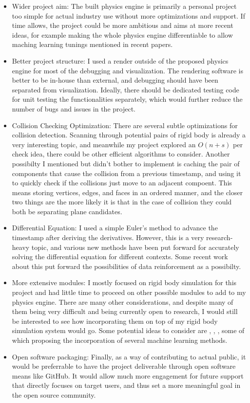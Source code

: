 \documentclass[12pt,a4paper,twoside,openright]{report}
\begin{document}
\begin{itemize}
\item Wider project aim: The built physics engine is primarily a personal project too simple for actual industry use without more optimizations and support. If time allows, the project could be more ambitious and aims at more recent ideas, for example making the whole physics engine differentiable to allow maching learning tunings mentioned in recent papers\cite{degrave2019differentiable}. 
\item Better project structure: I used a render outside of the proposed physics engine for most of the debugging and visualization. The rendering software is better to be in-house than external, and debugging should have been separated from visualization. Ideally, there should be dedicated testing code for unit testing the functionalities separately, which would further reduce the number of bugs and issues in the project.
\item Collision Checking Optimization: There are several subtle optimizations for collision detection. Scanning through potential pairs of rigid body is already a very interesting topic, and meanwhile my project explored an $O(n + s)$ per check idea, there could be other efficient algorithms to consider. Another possibilty I mentioned but didn't bother to implement is caching the pair of components that cause the collision from a previous timestamp, and using it to quickly check if the collisions just move to an adjacent compoent. This means storing vertices, edges, and faces in an ordered manner, and the closer two things are the more likely it is that in the case of collision they could both be separating plane candidates.
\item Differential Equation: I used a simple Euler's method to advance the timestamp after deriving the derivatives. However, this is a very research-heavy topic, and various new methods have been put forward for accurately solving the differential equation for different contexts. Some recent work about this put forward the possibilities of data reinforcement\cite{koch2021data} as a possibilty.
\item More extensive modules: I mostly focused on rigid body simulation for this project and had little time to proceed on other possible modules to add to my physics engine. There are many other considerations, and despite many of them being very difficult and being currently open to research, I would still be interested to see how incorporating them on top of my rigid body simulation system would go. Some potential ideas to consider are \cite{vinuesa2022enhancing}, \cite{obiols2020cfdnet}, \cite{li2022contact}, some of which proposing the incorporation of several machine learning methods.
\item Open software packaging: Finally, as a way of contributing to actual public, it would be preferrable to have the project deliverable through open software means like GitHub. It would allow much more engagement for future support that directly focuses on target users, and thus set a more meaningful goal in the open source community.
\end{itemize}
\end{document}
